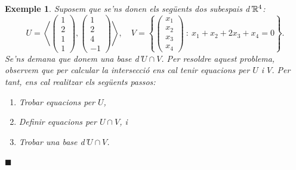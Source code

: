 \documentclass[
  11pt,
]{book}
\numberwithin{dummy}{section}
\theoremstyle{maincolornumbox}
\theoremstyle{blacknumex}
\newtheorem{exampleT}{Exemple}[chapter]
\theoremstyle{blacknumbox}
\theoremstyle{maincolornum}
\newenvironment{example}{\begin{exampleT}}{\hfill{\tiny\ensuremath{\blacksquare}}\end{exampleT}}
\newlength\esp
\begin{document}
\begin{example}
Suposem que se'ns donen els següents dos subespais d'\(\mathbb{R}^4\):
\[U = \left\langle \begin{pmatrix}1\\2\\1\\1\end{pmatrix},\begin{pmatrix}1\\2\\4\\-1\end{pmatrix}\right\rangle,\quad
    V = \left\{\begin{pmatrix}x_1\\x_2\\x_3\\x_4\end{pmatrix}~\colon ~ x_1 + x_2 + 2x_3 + x_4=0\right\}.\]
Se'ns demana que donem una base d'\(U\cap V\). Per resoldre aquest
problema, observem que per calcular la intersecció ens cal tenir
equacions per \(U\) i \(V\). Per tant, ens cal realitzar els següents
passos:

\begin{enumerate}
\def\labelenumi{\arabic{enumi}.}
\item
  Trobar equacions per \(U\),
\item
  Definir equacions per \(U\cap V\), i
\item
  Trobar una base d'\(U\cap V\).
\end{enumerate}


\end{example}
\end{document}
